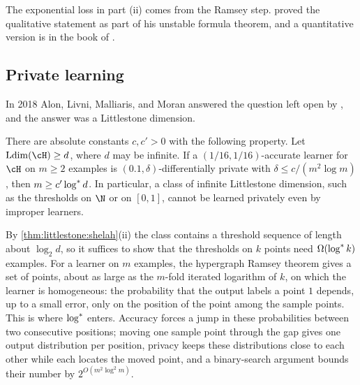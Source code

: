 \begin{refsection}
The exponential loss in part (ii) comes from the Ramsey step. \Textcite{Shelah1978} proved the qualitative statement as part of his unstable formula theorem, and a quantitative version is in the book of \textcite{Hodges1997}.

\subsection{Private learning}\label{sec:littlestone:private}

In 2018 Alon, Livni, Malliaris, and Moran answered the question left open by \textcite{BunNissimStemmerVadhan2015}, and the answer was a Littlestone dimension.

\begin{theorem}\label{thm:littlestone:almm}
There are absolute constants $c,c'>0$ with the following property. Let $\littlestoneLdim(\cH)\ge d$, where $d$ may be infinite. If a $(1/16,1/16)$-accurate learner for $\cH$ on $m\ge2$ examples is $(0.1,\delta)$-differentially private with $\delta\le c/(m^2\log m)$, then $m\ge c'\log^{*} d$. In particular, a class of infinite Littlestone dimension, such as the thresholds on $\N$ or on $[0,1]$, cannot be learned privately even by improper learners.
\end{theorem}

\begin{proofsketch}
By \cref{thm:littlestone:shelah}(ii) the class contains a threshold sequence of length about $\log_2 d$, so it suffices to show that the thresholds on $k$ points need $\Omega(\log^{*} k)$ examples. For a learner on $m$ examples, the hypergraph Ramsey theorem gives a set of points, about as large as the $m$-fold iterated logarithm of $k$, on which the learner is homogeneous: the probability that the output labels a point $1$ depends, up to a small error, only on the position of the point among the sample points. This is where $\log^{*}$ enters. Accuracy forces a jump in these probabilities between two consecutive positions; moving one sample point through the gap gives one output distribution per position, privacy keeps these distributions close to each other while each locates the moved point, and a binary-search argument bounds their number by $2^{O(m^2\log^2m)}$.
\end{proofsketch}


\end{refsection}
